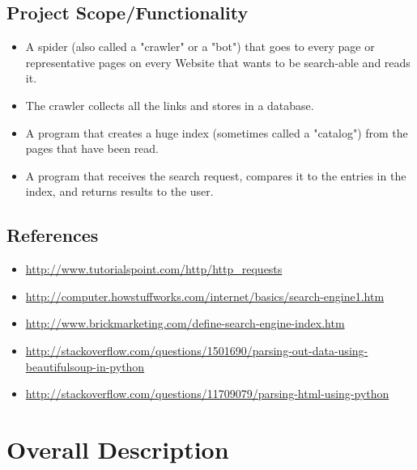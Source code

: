 \documentclass{scrreprt}
\begin{document}
\section{Project Scope/Functionality}
\begin{itemize}
  \item A spider (also called a "crawler" or a "bot") that goes to every page or representative pages on every Website that wants to be search-able and reads it.
 \item The crawler collects all the links and stores in a database.
 \item A program that creates a huge index (sometimes called a "catalog") from the pages that have been read.
 \item A program that receives the search request, compares it to the entries in the index, and returns results to the user.

\end{itemize}

\section{References}

\begin{itemize}

  \item \href{http://www.tutorialspoint.com/http/http_requests}{http://www.tutorialspoint.com/http/http_requests} 
  
  \item \href{http://computer.howstuffworks.com/internet/basics/search-engine1.htm}{http://computer.howstuffworks.com/internet/basics/search-engine1.htm}
  \item \href{http://www.brickmarketing.com/define-search-engine-index.htm}{http://www.brickmarketing.com/define-search-engine-index.htm}
  \item \href{http://stackoverflow.com/questions/1501690/parsing-out-data-using-beautifulsoup-in-python}{http://stackoverflow.com/questions/1501690/parsing-out-data-using-beautifulsoup-in-python}
  \item \href{http://stackoverflow.com/questions/11709079/parsing-html-using-python}{http://stackoverflow.com/questions/11709079/parsing-html-using-python}
  
  
  
  
\end{itemize}



\chapter{Overall Description}
\end{document}

